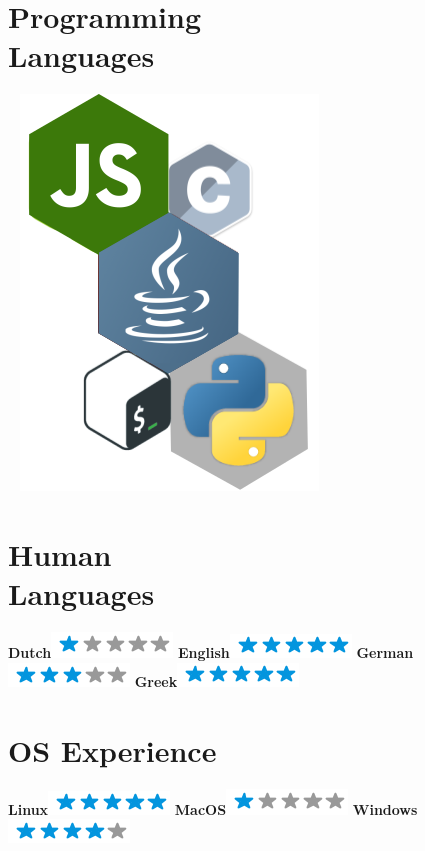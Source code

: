 \documentclass[]{friggeri-cv}
\begin{document}
\begin{aside}
  \section{Programming \\ Languages}
  ~
  \includegraphics[scale=0.45]{img/newLanguages2.png}
  \section{Human \\ Languages}
    \textbf{Dutch}\includegraphics[scale=0.40]{img/1stars.png}
    \textbf{English}\includegraphics[scale=0.40]{img/5stars.png}
    \textbf{German}\includegraphics[scale=0.40]{img/3stars.png}
    \textbf{Greek}\includegraphics[scale=0.40]{img/5stars.png}
  \section{OS Experience}
    \textbf{Linux}\includegraphics[scale=0.40]{img/5stars.png}
    \textbf{MacOS}\includegraphics[scale=0.40]{img/1stars.png}
    \textbf{Windows}\includegraphics[scale=0.40]{img/4stars.png}
    ~
\end{aside}
~
\end{document}
